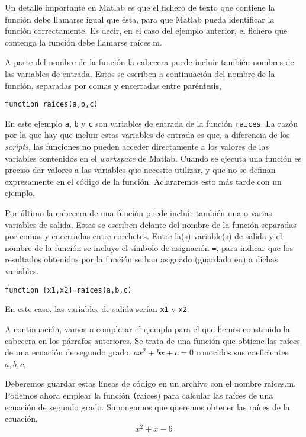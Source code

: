 Un detalle importante en Matlab es que el fichero de texto que contiene la función debe llamarse igual que ésta, para que Matlab pueda identificar la función correctamente. Es decir, en el caso del ejemplo anterior, el fichero que contenga la función debe llamarse raíces.m.

A parte del nombre de la función la cabecera puede incluir también nombres de las variables de entrada. Estos se escriben a continuación del nombre de la función, separadas por comas y encerradas entre paréntesis,

\begin{verbatim}
function raices(a,b,c)
\end{verbatim}

En este ejemplo \texttt{a}, \texttt{b} y \texttt{c} son variables de entrada de la función \texttt{raices}. La razón por la que hay que incluir estas variables de entrada es que, a diferencia de los \emph{scripts}, las funciones no pueden acceder directamente a los valores de las variables contenidos en el \emph{workspace} de Matlab. Cuando se ejecuta una función es preciso dar valores a las variables que necesite utilizar, y que no se definan expresamente en el código de la función. Aclararemos esto más tarde con un ejemplo.

Por último la cabecera de una función puede incluir también una o varias variables de salida. Estas se escriben delante del nombre de la función separadas por comas y encerradas entre corchetes. Entre la(s) variable(s) de salida y el nombre de la función se incluye el símbolo de asignación \texttt{=}, para indicar que los resultados obtenidos por la función se han asignado (guardado en) a dichas variables.

\begin{verbatim}
function [x1,x2]=raices(a,b,c)
\end{verbatim}
  
En este caso, las variables de salida serían \texttt{x1} y \texttt{x2}.

A continuación, vamos a completar el ejemplo para el que hemos construido la cabecera en los párrafos anteriores. Se trata de una función que obtiene las raíces de una ecuación de segundo grado, $ax^2+bx+c=0$ conocidos sus coeficientes $a, b, c$,

%

Deberemos guardar estas líneas de código en un archivo con el nombre raices.m. Podemos ahora emplear la función \texttt(raices) para calcular las raíces de una ecuación de segundo grado. Supongamos que queremos obtener las raíces de la ecuación,
\begin{equation*}
x^2+x-6
\end{equation*}

